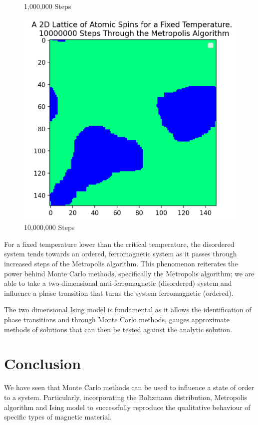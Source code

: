 \documentclass[a4paper]{article}
\begin{document}
\begin{figure}[!htb]
  \caption{1,000,000 Steps}\label{fig:100steps}
\endminipage\hfill
{}%
  \includegraphics[width=\linewidth]{10,000,000 steps.png}
  \caption{10,000,000 Steps}\label{fig:1000steps}
\endminipage
\end{figure}

For a fixed temperature lower than the critical temperature, the disordered system tends towards an ordered, ferromagnetic system as it passes through increased steps of the Metropolis algorithm. This phenomenon reiterates the power behind Monte Carlo methods, specifically the Metropolis algorithm; we are able to take a two-dimensional anti-ferromagnetic (disordered) system and influence a phase transition that turns the system ferromagnetic (ordered). 

The two dimensional Ising model is fundamental as it allows the identification of phase transitions and through Monte Carlo methods, gauges approximate methods of solutions that can then be tested against the analytic solution.

\section{Conclusion}
We have seen that Monte Carlo methods can be used to influence a state of order to a system. Particularly, incorporating the Boltzmann distribution, Metropolis algorithm and Ising model to successfully reproduce the qualitative behaviour of specific types of magnetic material. 
\end{document}
